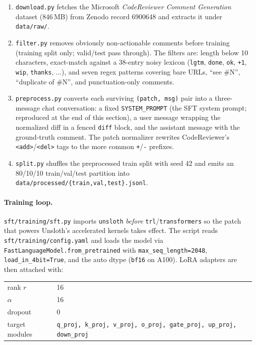 \documentclass[11pt,a4paper]{article}
\newcommand{\code}[1]{\texttt{\small #1}}
\renewcommand{\path}[1]{\texttt{\small\color{mute} #1}}
\begin{document}
\begin{enumerate}[leftmargin=*]
  \item \code{download.py} fetches the Microsoft \emph{CodeReviewer
        Comment Generation} dataset (846\,MB) from Zenodo record 6900648
        and extracts it under \path{data/raw/}.
  \item \code{filter.py} removes obviously non-actionable comments before
        training (training split only; valid/test pass through). The
        filters are: length below 10 characters, exact-match against a
        38-entry noisy lexicon (\code{lgtm}, \code{done}, \code{ok},
        \code{+1}, \code{wip}, \code{thanks}, $\ldots$), and seven regex
        patterns covering bare URLs, ``see \#N'', ``duplicate of \#N'',
        and punctuation-only comments.
  \item \code{preprocess.py} converts each surviving \code{(patch, msg)}
        pair into a three-message chat conversation: a fixed
        \code{SYSTEM\_PROMPT} (the SFT system prompt; reproduced at the
        end of this section), a user message wrapping the normalized diff
        in a fenced \code{diff} block, and the assistant message with the
        ground-truth comment. The patch normalizer rewrites
        CodeReviewer's \code{<add>}/\code{<del>} tags to the more
        common \code{+}/\code{-} prefixes.
  \item \code{split.py} shuffles the preprocessed train split with seed
        42 and emits an 80/10/10 train/val/test partition into
        \path{data/processed/\{train,val,test\}.jsonl}.
\end{enumerate}

\paragraph{Training loop.} \code{sft/training/sft.py} imports
\code{unsloth} \emph{before} \code{trl}/\code{transformers} so the patch
that powers Unsloth's accelerated kernels takes effect. The script reads
\path{sft/training/config.yaml} and loads the model via
\code{FastLanguageModel.from\_pretrained} with \code{max\_seq\_length=2048},
\code{load\_in\_4bit=True}, and the auto dtype (\code{bf16} on A100). LoRA
adapters are then attached with:

\begin{tabular}{@{}ll@{}}
rank $r$              & 16 \\
$\alpha$              & 16 \\
dropout               & 0  \\
target modules        & \code{q\_proj, k\_proj, v\_proj, o\_proj, gate\_proj, up\_proj, down\_proj} \\
\end{tabular}
\end{document}
